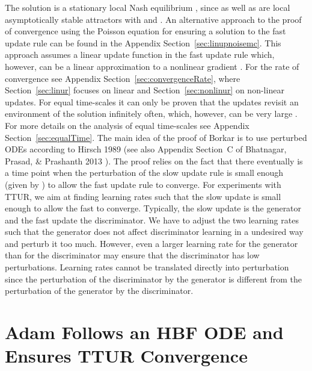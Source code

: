 \documentclass{article}
\begin{document}
The solution  is a
stationary local Nash equilibrium \cite{Prasad:15}, since
 as well
as  are local asymptotically stable
attractors with  and
.
An alternative approach to the proof of convergence
using the Poisson equation for ensuring a
solution to the fast update rule can be found in the Appendix
Section~\ref{sec:linupnoisemc}.
This approach assumes a linear update function in the fast
update rule which, however,
can be a linear approximation to a nonlinear gradient \cite{Konda:02,Konda:03}.
For the rate of convergence see Appendix Section~\ref{sec:convergenceRate},
where Section~\ref{sec:linur} focuses on linear and
Section~\ref{sec:nonlinur} on non-linear updates.
For equal time-scales it can only be proven that
the updates revisit an environment of the solution infinitely often,
which, however, can be very large \cite{Zhang:07,DiCastro:10}.
For more details on the analysis of
equal time-scales see Appendix Section~\ref{sec:equalTime}.
The main idea of the proof of Borkar
\cite{Borkar:97} is to use
 perturbed ODEs according to Hirsch 1989 \cite{Hirsch:89}
(see also Appendix Section~C of  Bhatnagar, Prasad, \& Prashanth 2013 \cite{Bhatnagar:13}).
The proof relies on the fact that
there eventually is a time point when the perturbation of the slow
update rule is
small enough (given by ) to allow the fast update rule to converge.
For experiments with TTUR, we aim at
finding learning rates such that the slow update is small enough
to allow the fast to converge.
Typically, the slow update is the generator and the fast update the
discriminator.
We have to adjust the two learning rates such that
the generator does not affect discriminator learning
in a undesired way and perturb it too much.
However, even a larger learning rate for the generator than for the
discriminator may ensure that the discriminator has low perturbations.
Learning rates cannot be translated directly into perturbation since
the perturbation of the discriminator by the generator is
different from the perturbation of the generator by the discriminator.

\section*{Adam Follows an HBF ODE and Ensures TTUR Convergence}
\label{sec:adamhbf}
\end{document}
